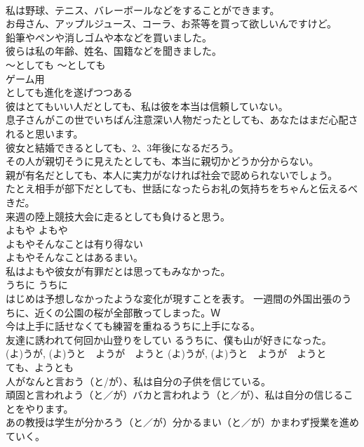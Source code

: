 \documentclass[8pt]{extreport}
\begin{document}
\begin{CJK}{UTF8}{min}
\\	私は野球、テニス、バレーボールなどをすることができます。  
\\	お母さん、アップルジュース、コーラ、お茶等を買って欲しいんですけど。  
\\	鉛筆やペンや消しゴムや本などを買いました。  
\\	彼らは私の年齢、姓名、国籍などを聞きました。  
\\	〜としても	〜としても	
\\	ゲーム用
\\	としても進化を遂げつつある
\\	彼はとてもいい人だとしても、私は彼を本当は信頼していない。   
\\	息子さんがこの世でいちばん注意深い人物だったとしても、あなたはまだ心配されると思います。  
\\	彼女と結婚できるとしても、2、3年後になるだろう。   
\\	その人が親切そうに見えたとしても、本当に親切かどうか分からない。  
\\	親が有名だとしても、本人に実力がなければ社会で認められないでしょう。   
\\	たとえ相手が部下だとしても、世話になったらお礼の気持ちをちゃんと伝えるべきだ。  
\\	来週の陸上競技大会に走るとしても負けると思う。  
\\	よもや	よもや	
\\	よもやそんなことは有り得ない  
\\	よもやそんなことはあるまい。  
\\	私はよもや彼女が有罪だとは思ってもみなかった。  
\\	うちに	うちに	
\\	はじめは予想しなかったような変化が現すことを表す。	一週間の外国出張のうちに、近くの公園の桜が全部散ってしまった。Ｗ
\\	今は上手に話せなくても練習を重ねるうちに上手になる。  
\\	友達に誘われて何回か山登りをしてい るうちに、僕も山が好きになった。  
\\	(よ)うが, (よ)うと　ようが　ようと	(よ)うが, (よ)うと　ようが　ようと	
\\	ても、ようとも
\\	人がなんと言おう（と/が）、私は自分の子供を信じている。  
\\	頑固と言われよう（と／が）バカと言われよう（と／が）、私は自分の信じることをやります。  
\\	あの教授は学生が分かろう（と／が）分かるまい（と／が）かまわず授業を進めていく。   

\end{CJK}
\end{document}
